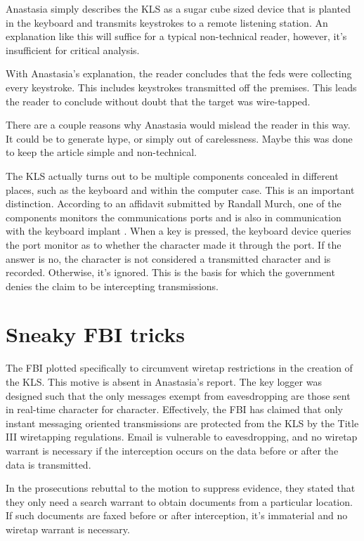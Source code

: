 \documentclass[12pt,titlepage]{article}             %
\begin{document}
  Anastasia simply describes the KLS as a sugar cube sized device that
  is planted in the keyboard and transmits keystrokes to a remote
  listening station.  An explanation like this will suffice for a
  typical non-technical reader, however, it's insufficient for
  critical analysis.
  
  With Anastasia's explanation, the reader concludes that the feds
  were collecting every keystroke.  This includes keystrokes
  transmitted off the premises.  This leads the reader to conclude
  without doubt that the target was wire-tapped.

  There are a couple reasons why Anastasia would mislead the reader in
  this way.  It could be to generate hype, or simply out of
  carelessness.  Maybe this was done to keep the article simple and
  non-technical.  
  
  The KLS actually turns out to be multiple components concealed in
  different places, such as the keyboard and within the computer case.
  This is an important distinction.  According to an affidavit
  submitted by Randall Murch, one of the components monitors the
  communications ports and is also in communication with the keyboard
  implant \cite{RANDALL}.  When a key is pressed, the keyboard device
  queries the port monitor as to whether the character made it through
  the port.  If the answer is no, the character is not considered a
  transmitted character and is recorded.  Otherwise, it's ignored.
  This is the basis for which the government denies the claim to be
  intercepting transmissions.

  \section{Sneaky FBI tricks}
  
  The FBI plotted specifically to circumvent wiretap restrictions in
  the creation of the KLS.  This motive is absent in Anastasia's
  report.  The key logger was designed such that the only messages
  exempt from eavesdropping are those sent in real-time character for
  character.  Effectively, the FBI has claimed that only instant
  messaging oriented transmissions are protected from the KLS by the
  Title III wiretapping regulations.  Email is vulnerable to
  eavesdropping, and no wiretap warrant is necessary if the
  interception occurs on the data before or after the data is
  transmitted.

  In the prosecutions rebuttal to the motion to suppress evidence,
  they stated that they only need a search warrant to obtain documents
  from a particular location.  If such documents are faxed before or
  after interception, it's immaterial and no wiretap warrant is
  necessary.  
  
\end{document}
